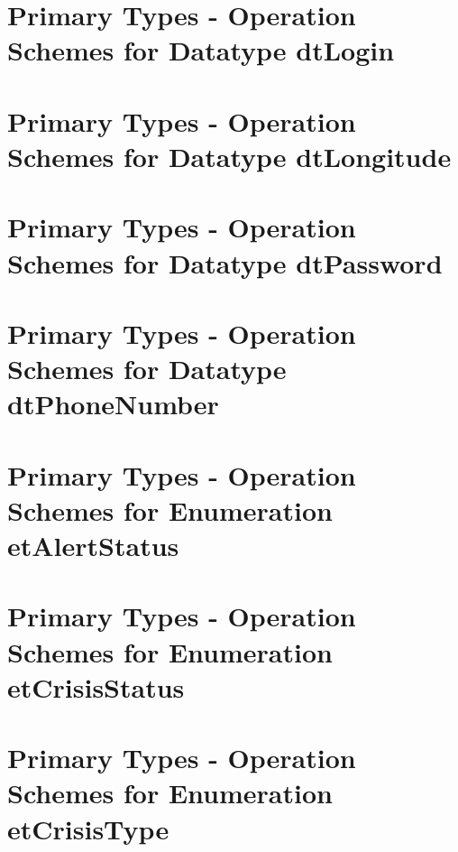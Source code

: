 \section{Primary Types - Operation Schemes for Datatype dtLogin} 
\label{OM-CM-PTDataType-dtLogin}

\section{Primary Types - Operation Schemes for Datatype dtLongitude} 
\label{OM-CM-PTDataType-dtLongitude}

\section{Primary Types - Operation Schemes for Datatype dtPassword} 
\label{OM-CM-PTDataType-dtPassword}

\section{Primary Types - Operation Schemes for Datatype dtPhoneNumber} 
\label{OM-CM-PTDataType-dtPhoneNumber}





\section{Primary Types - Operation Schemes for Enumeration etAlertStatus} 
\label{OM-CM-PTEnumType-etAlertStatus}

\section{Primary Types - Operation Schemes for Enumeration etCrisisStatus} 
\label{OM-CM-PTEnumType-etCrisisStatus}

\section{Primary Types - Operation Schemes for Enumeration etCrisisType} 
\label{OM-CM-PTEnumType-etCrisisType}

